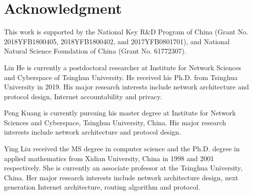 \documentclass[journal]{IEEEtran}
\begin{document}
\section*{Acknowledgment}
    This work is supported by the National Key R\&D Program of China (Grant No. 2018YFB1800405, 2018YFB1800402, and 2017YFB0801701), and National Natural Science Foundation of China (Grant No. 61772307).



\vspace{-1.1 cm}
\begin{IEEEbiographynophoto}{Lin He}
is currently a postdoctoral researcher at Institute for Network Sciences and Cyberspace of Tsinghua University. He received his Ph.D. from Tsinghua University in 2019. His major research interests include network architecture and protocol design, Internet accountability and privacy.
\vspace{-1cm}
\end{IEEEbiographynophoto}

\begin{IEEEbiographynophoto}{Peng Kuang}
is currently pursuing his master degree at Institute for Network Sciences and Cyberspace, Tsinghua University, China. His major research interests include network architecture and protocol design.
\vspace{-1.1 cm}
\end{IEEEbiographynophoto}


\begin{IEEEbiographynophoto}{Ying Liu}
received the MS degree in computer science and the Ph.D. degree in applied mathematics from Xidian University, China in 1998 and 2001 respectively. She is currently an associate professor at the Tsinghua University, China. Her major research interests include network architecture design, next generation Internet architecture, routing algorithm and protocol.
\vspace{-1.1 cm}
\end{IEEEbiographynophoto}
\end{document}
